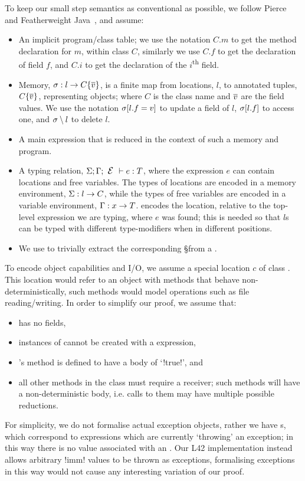 To keep our small step semantics as conventional as possible, we follow Pierce~\cite{pierce2002types} and Featherweight Java~\cite{IgarashiEtAl01}, and assume:
\SSI\begin{itemize}
	\item An implicit program/class table; we use the notation $C.m$ to get the method declaration for $m$, within class $C$, similarly we use $C.f$ to get the declaration of field $f$, and $C.i$ to get the declaration of the $i$\textsuperscript{th} field.
	\item Memory, $\s : l\rightarrow C\{\Many{v}\}${, is} a finite map from locations, $l$, to annotated tuples, $C\{\Many{v}\}$, representing objects; where $C$ is the class name and $\Many{v}$ are the field values.
	We use the notation $\s[l.f=v]$ to update a field of $l$, $\s[l.f]$ to access one, and $\s \setminus l$ to delete $l$.
	\item A main expression that is reduced in the context of such a memory and program.
	\item A typing relation, $\S;\G;\E\vdash e:T$, where 
	the expression $e$ can contain locations and free variables. The types of locations are encoded in 
a memory environment, 
$\S : l\rightarrow C$,
	while the types of free variables are encoded in
a variable environment, $\G : x\rightarrow T$. \E encodes the location, relative to the top-level expression we are typing, where $e$ was found; this is needed so that $l$s can be typed with different type-modifiers when in different positions.
	\item We use \Ss to trivially extract the corresponding \S from a \s.
\end{itemize}

\noindent To encode object capabilities and I/O, we assume a special location  $c$ of class \Q@Cap@. This location would refer to an object with methods that behave non-deterministically, such methods would model operations such as file reading/writing. In order to simplify our proof, we assume that:
\SSI\begin{itemize}
	\item \Q@Cap@ has no fields,
	\item instances of \Q@Cap@ cannot be created with a \Q@new@ expression,
	\item \Q@Cap@'s \Q@invariant@ method is defined to have a body of `\Q!true!', and
	\item all other methods in the \Q@Cap@ class must require a \Q@mut@ receiver; such methods will have a non-deterministic body, i.e. calls to them may have multiple possible reductions.
\end{itemize}
For simplicity, we do not formalise actual exception objects, rather we have \error{}s, which correspond to expressions which are currently  `throwing' an exception; 
in this way there is no value associated with an \error.
Our L42 implementation instead allows arbitrary \Q!imm! values to be thrown as exceptions, formalising exceptions in this way would not cause any interesting variation of our proof.

